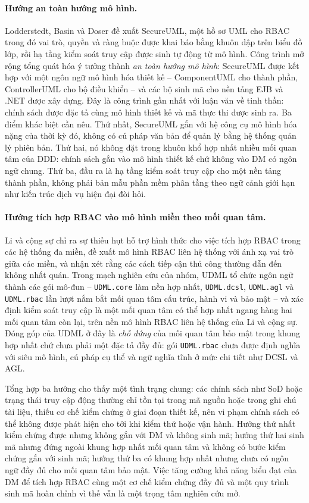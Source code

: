 \paragraph{Hướng an toàn hướng mô hình.}
Lodderstedt, Basin và Doser \cite{lodderstedt2002} đề xuất SecureUML, một hồ sơ UML cho RBAC trong đó vai trò, quyền và ràng buộc được khai báo bằng khuôn dập trên biểu đồ lớp, rồi hạ tầng kiểm soát truy cập được sinh tự động từ mô hình. Công trình mở rộng \cite{basin2006} tổng quát hóa ý tưởng thành \emph{an toàn hướng mô hình}: SecureUML được kết hợp với một ngôn ngữ mô hình hóa thiết kế -- ComponentUML cho thành phần, ControllerUML cho bộ điều khiển -- và các bộ sinh mã cho nền tảng EJB và .NET được xây dựng. Đây là công trình gần nhất với luận văn về tinh thần: chính sách được đặc tả cùng mô hình thiết kế và mã thực thi được sinh ra. Ba điểm khác biệt cần nêu. Thứ nhất, SecureUML gắn với hệ công cụ mô hình hóa nặng của thời kỳ đó, không có cú pháp văn bản để quản lý bằng hệ thống quản lý phiên bản. Thứ hai, nó không đặt trong khuôn khổ hợp nhất nhiều mối quan tâm của DDD: chính sách gắn vào mô hình thiết kế chứ không vào DM có ngôn ngữ chung. Thứ ba, đầu ra là hạ tầng kiểm soát truy cập cho một nền tảng thành phần, không phải bản mẫu phần mềm phân tầng theo ngữ cảnh giới hạn như kiến trúc dịch vụ hiện đại đòi hỏi.

\paragraph{Hướng tích hợp RBAC vào mô hình miền theo mối quan tâm.}
Li và cộng sự \cite{li2022} chỉ ra sự thiếu hụt hỗ trợ hình thức cho việc tích hợp RBAC trong các hệ thống đa miền, đề xuất mô hình RBAC liên hệ thống với ánh xạ vai trò giữa các miền, và nhận xét rằng các cách tiếp cận thủ công thường dẫn đến không nhất quán. Trong mạch nghiên cứu của nhóm, UDML \cite{le2025udml} tổ chức ngôn ngữ thành các gói mô-đun -- \texttt{UDML.core} làm nền hợp nhất, \texttt{UDML.dcsl}, \texttt{UDML.agl} và \texttt{UDML.rbac} lần lượt nắm bắt mối quan tâm cấu trúc, hành vi và bảo mật -- và xác định kiểm soát truy cập là một mối quan tâm có thể hợp nhất ngang hàng hai mối quan tâm còn lại, trên nền mô hình RBAC liên hệ thống của Li và cộng sự. Đóng góp của UDML ở đây là \emph{chỗ đứng} của mối quan tâm bảo mật trong khung hợp nhất chứ chưa phải một đặc tả đầy đủ: gói \texttt{UDML.rbac} chưa được định nghĩa với siêu mô hình, cú pháp cụ thể và ngữ nghĩa tĩnh ở mức chi tiết như DCSL và AGL.

Tổng hợp ba hướng cho thấy một tình trạng chung: các chính sách như SoD hoặc trạng thái truy cập động thường chỉ tồn tại trong mã nguồn hoặc trong ghi chú tài liệu, thiếu cơ chế kiểm chứng ở giai đoạn thiết kế, nên vi phạm chính sách có thể không được phát hiện cho tới khi kiểm thử hoặc vận hành. Hướng thứ nhất kiểm chứng được nhưng không gắn với DM và không sinh mã; hướng thứ hai sinh mã nhưng đứng ngoài khung hợp nhất mối quan tâm và không có bước kiểm chứng gắn với sinh mã; hướng thứ ba có khung hợp nhất nhưng chưa có ngôn ngữ đầy đủ cho mối quan tâm bảo mật. Việc tăng cường khả năng biểu đạt của DM để tích hợp RBAC cùng một cơ chế kiểm chứng đầy đủ và một quy trình sinh mã hoàn chỉnh vì thế vẫn là một trọng tâm nghiên cứu mở.

